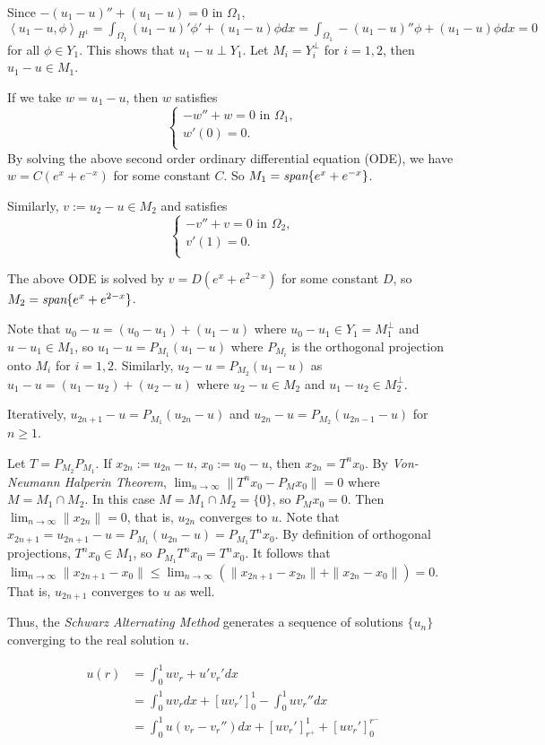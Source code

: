 \documentclass[11pt, a4paper]{amsart}
\begin{document}
Since $-(u_1-u)''+(u_1-u)=0 \mbox{ in } \Omega_1,$
$\left\langle u_1-u,\phi\right\rangle_{H^1}=\int_{\Omega_1}(u_1-u)'\phi'+(u_1-u)\phi dx=\int_{\Omega_1}-(u_1-u)''\phi+(u_1-u)\phi dx=0$ for all $\phi\in Y_1$. This shows that $u_1-u\perp Y_1$. Let $M_i=Y_{i}^{\perp}$ for $i=1,2$, then $u_1-u\in M_1$. 

If we take $w=u_1-u$, then $w$ satisfies
$$\begin{cases}
-w''+w=0 \mbox{ in } \Omega_1,\\
w'(0)=0.\\
\end{cases}$$
By solving the above second order ordinary differential equation (ODE), we have $w=C(e^x+e^{-x})$ for some constant $C$. So $M_1=\emph{span}\{e^x+e^{-x}\}$.

Similarly, $v:=u_2-u\in M_2$ and satisfies 
$$\begin{cases}
-v''+v=0 \mbox{ in } \Omega_2,\\
v'(1)=0.\\
\end{cases}$$

The above ODE is solved by $v=D(e^x+e^{2-x})$ for some constant $D$, so $M_2=\emph{span}\{e^x+e^{2-x}\}$.

Note that $u_0-u=(u_0-u_1)+(u_1-u)$ where $u_0-u_1\in Y_1=M_{1}^{\perp}$ and $u-u_1\in M_1$, so $u_1-u=P_{M_1}(u_1-u)$ where $P_{M_i}$ is the orthogonal projection onto $M_i$ for $i=1,2$. Similarly, $u_2-u=P_{M_2}(u_1-u)$ as $u_1-u=(u_1-u_2)+(u_2-u)$ where $u_2-u\in M_2$ and $u_1-u_2\in M_{2}^{\perp}$.

Iteratively, $u_{2n+1}-u=P_{M_1}(u_{2n}-u)$ and $u_{2n}-u=P_{M_2}(u_{2n-1}-u)$ for $n\geq 1$.

Let $T=P_{M_2}P_{M_1}$. If $x_{2n}:=u_{2n}-u$, $x_0:=u_0-u$, then $x_{2n}=T^n x_0$.
By \emph{Von-Neumann Halperin Theorem}, $\lim_{n\rightarrow \infty}\|T^n x_0-P_{M}x_0\|=0$ where $M=M_1\cap M_2$. In this case $M=M_1\cap M_2=\{0\}$, so $P_{M}x_0=0$. Then $\lim_{n\rightarrow \infty} \|x_{2n}\|=0$, that is, $u_{2n}$ converges to $u$.
Note that $x_{2n+1}=u_{2n+1}-u=P_{M_1}(u_{2n}-u)=P_{M_1}T^n x_0$.
By definition of orthogonal projections, $T^n x_0\in M_1$, so $P_{M_1}T^n x_0=T^n x_0$.
It follows that 
$\lim_{n\rightarrow \infty}\|x_{2n+1}-x_0\|\leq\lim_{n\rightarrow \infty} (\|x_{2n+1}-x_{2n}\|+\|x_{2n}-x_0\|)=0$. That is, $u_{2n+1}$ converges to $u$ as well.

Thus, the \emph{Schwarz Alternating Method} generates a sequence of solutions $\{u_n\}$ converging to the real solution $u$.

\begin{align*}
u(r)&=\int_{0}^{1} u{v_r}+ u'{v_r}' dx\\
{}&=\int_{0}^{1} u{v_r} dx+\left[u{v_r}'\right]_{0}^{1}-\int_{0}^{1} u {v_r}''dx\\
{}&=\int_{0}^{1} u({v_r}-{v_r}'')dx+\left[u{v_r}'\right]_{r^{+}}^{1}+\left[u{v_r}'\right]_{0}^{r^{-}}\\
\end{align*}
\end{document}
